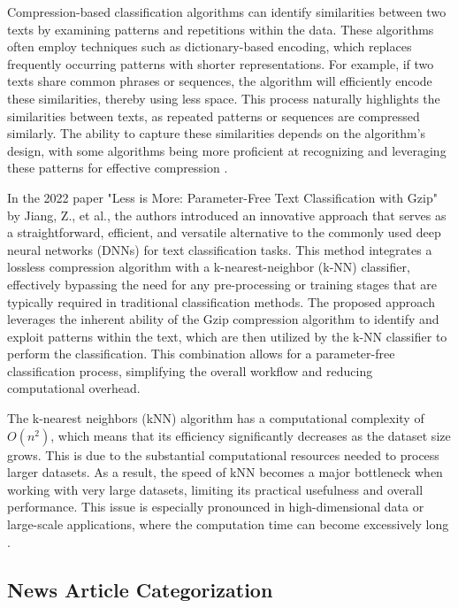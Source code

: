 \documentclass{article}
\begin{document}
Compression-based classification algorithms can identify similarities between two texts by examining patterns and repetitions within the data. These algorithms often employ techniques such as dictionary-based encoding, which replaces frequently occurring patterns with shorter representations. For example, if two texts share common phrases or sequences, the algorithm will efficiently encode these similarities, thereby using less space. This process naturally highlights the similarities between texts, as repeated patterns or sequences are compressed similarly. The ability to capture these similarities depends on the algorithm's design, with some algorithms being more proficient at recognizing and leveraging these patterns for effective compression \cite{Ozan2024}.

In the 2022 paper "Less is More: Parameter-Free Text Classification with Gzip" by Jiang, Z., et al., the authors introduced an innovative approach that serves as a straightforward, efficient, and versatile alternative to the commonly used deep neural networks (DNNs) for text classification tasks. This method integrates a lossless compression algorithm with a k-nearest-neighbor (k-NN) classifier, effectively bypassing the need for any pre-processing or training stages that are typically required in traditional classification methods. The proposed approach leverages the inherent ability of the Gzip compression algorithm to identify and exploit patterns within the text, which are then utilized by the k-NN classifier to perform the classification. This combination allows for a parameter-free classification process, simplifying the overall workflow and reducing computational overhead.

The k-nearest neighbors (kNN) algorithm has a computational complexity of  \(O(n^2)\), which means that its efficiency significantly decreases as the dataset size grows. This is due to the substantial computational resources needed to process larger datasets. As a result, the speed of kNN becomes a major bottleneck when working with very large datasets, limiting its practical usefulness and overall performance. This issue is especially pronounced in high-dimensional data or large-scale applications, where the computation time can become excessively long \cite{Jiang2023}.

\subsection{News Article Categorization}
\end{document}
